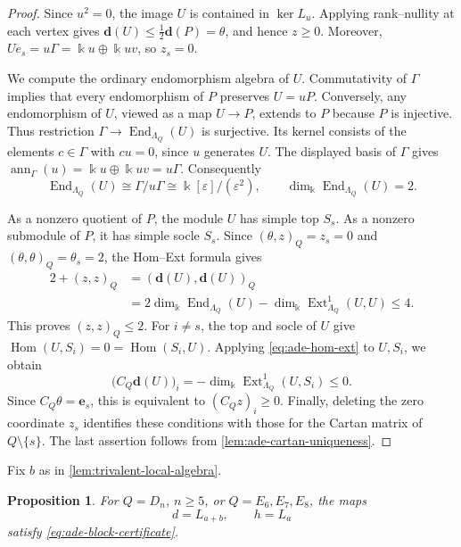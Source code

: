 \documentclass[a4paper,11pt,reqno]{amsart}
\newtheorem{proposition}[proposition]{Proposition}
\theoremstyle{definition}
\theoremstyle{plain}
\numberwithin{equation}{section}
\newcommand{\Hom}{\operatorname{Hom}}
\newcommand{\End}{\operatorname{End}}
\newcommand{\Ext}{\operatorname{Ext}}
\newcommand{\kk}{\Bbbk}
\begin{document}
\begin{proof}
Since \(u^2=0\), the image \(U\) is contained in \(\ker L_u\).
Applying rank--nullity at each vertex gives
\(\mathbf d(U)\leq\frac12\mathbf d(P)=\theta\), and hence
\(z\geq0\).  Moreover,
\(Ue_s=u\Gamma=\kk u\oplus\kk uv\), so \(z_s=0\).

We compute the ordinary endomorphism algebra of \(U\).
Commutativity of \(\Gamma\) implies that every endomorphism of
\(P\) preserves \(U=uP\).  Conversely, any endomorphism of
\(U\), viewed as a map \(U\to P\), extends to \(P\) because
\(P\) is injective.  Thus restriction
\(\Gamma\to\End_{\Lambda_Q}(U)\) is surjective.
Its kernel consists of the elements \(c\in\Gamma\) with
\(cu=0\), since \(u\) generates \(U\).  The displayed basis
of \(\Gamma\) gives
\(\operatorname{ann}_\Gamma(u)=\kk u\oplus\kk uv=u\Gamma\).
Consequently
\[
 \End_{\Lambda_Q}(U)\cong\Gamma/u\Gamma
 \cong\kk[\varepsilon]/(\varepsilon^2),
 \qquad\dim_\kk\End_{\Lambda_Q}(U)=2.
\]

As a nonzero quotient of \(P\), the module \(U\) has simple top
\(S_s\).  As a nonzero submodule of \(P\), it has simple socle
\(S_s\).  Since \((\theta,z)_Q=z_s=0\) and
\((\theta,\theta)_Q=\theta_s=2\), the Hom--Ext formula gives
\[
\begin{aligned}
 2+(z,z)_Q
 &=(\mathbf d(U),\mathbf d(U))_Q\\
 &=2\dim_\kk\End_{\Lambda_Q}(U)
   -\dim_\kk\Ext^1_{\Lambda_Q}(U,U)
 \leq4.
\end{aligned}
\]
This proves \((z,z)_Q\leq2\).
For \(i\ne s\), the top and socle of \(U\) give
\(\Hom(U,S_i)=0=\Hom(S_i,U)\).  Applying
\eqref{eq:ade-hom-ext} to \(U,S_i\), we obtain
\[
 \bigl(C_Q\mathbf d(U)\bigr)_i
 =-\dim_\kk\Ext^1_{\Lambda_Q}(U,S_i)\leq0.
\]
Since \(C_Q\theta=\mathbf e_s\), this is equivalent to
\((C_Qz)_i\geq0\).
Finally, deleting the zero coordinate \(z_s\) identifies these
conditions with those for the Cartan matrix of
\(Q\setminus\{s\}\).  The last assertion follows from
\cref{lem:ade-cartan-uniqueness}.
\end{proof}

Fix \(b\) as in \cref{lem:trivalent-local-algebra}.

\begin{proposition}
\label{prop:trivalent-period-one}
For \(Q=D_n\), \(n\ge5\), or \(Q=E_6,E_7,E_8\), the maps
\[
 d=L_{a+b},\qquad h=L_a
\]
satisfy \eqref{eq:ade-block-certificate}.
\end{proposition}
\end{document}
